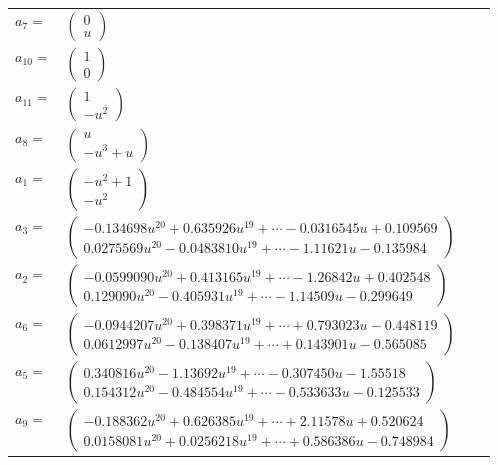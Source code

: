 \documentclass[1p]{elsarticle_modified}
\theoremstyle{definition}
\begin{document}
\begin{tabular}{m{7pt} m{180pt} m{7pt} m{180pt} }
\flushright $a_{7}=$&$\begin{pmatrix}0\\u\end{pmatrix}$ \\
\flushright $a_{10}=$&$\begin{pmatrix}1\\0\end{pmatrix}$ \\
\flushright $a_{11}=$&$\begin{pmatrix}1\\- u^2\end{pmatrix}$ \\
\flushright $a_{8}=$&$\begin{pmatrix}u\\- u^3+u\end{pmatrix}$ \\
\flushright $a_{1}=$&$\begin{pmatrix}- u^2+1\\- u^2\end{pmatrix}$ \\
\flushright $a_{3}=$&$\begin{pmatrix}-0.134698 u^{20}+0.635926 u^{19}+\cdots-0.0316545 u+0.109569\\0.0275569 u^{20}-0.0483810 u^{19}+\cdots-1.11621 u-0.135984\end{pmatrix}$ \\
\flushright $a_{2}=$&$\begin{pmatrix}-0.0599090 u^{20}+0.413165 u^{19}+\cdots-1.26842 u+0.402548\\0.129090 u^{20}-0.405931 u^{19}+\cdots-1.14509 u-0.299649\end{pmatrix}$ \\
\flushright $a_{6}=$&$\begin{pmatrix}-0.0944207 u^{20}+0.398371 u^{19}+\cdots+0.793023 u-0.448119\\0.0612997 u^{20}-0.138407 u^{19}+\cdots+0.143901 u-0.565085\end{pmatrix}$ \\
\flushright $a_{5}=$&$\begin{pmatrix}0.340816 u^{20}-1.13692 u^{19}+\cdots-0.307450 u-1.55518\\0.154312 u^{20}-0.484554 u^{19}+\cdots-0.533633 u-0.125533\end{pmatrix}$ \\
\flushright $a_{9}=$&$\begin{pmatrix}-0.188362 u^{20}+0.626385 u^{19}+\cdots+2.11578 u+0.520624\\0.0158081 u^{20}+0.0256218 u^{19}+\cdots+0.586386 u-0.748984\end{pmatrix}$ \\

\end{tabular}
\end{document}
